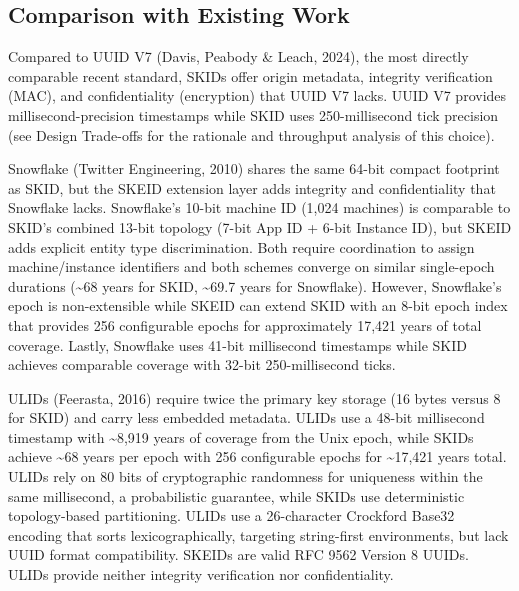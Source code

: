 \documentclass[fleqn,10pt]{wlpeerj}
\begin{document}
\subsection{Comparison with Existing
Work}\label{comparison-with-existing-work}

Compared to UUID V7 (Davis, Peabody \& Leach, 2024), the most directly
comparable recent standard, SKIDs offer origin metadata, integrity
verification (MAC), and confidentiality (encryption) that UUID V7 lacks.
UUID V7 provides millisecond-precision timestamps while SKID uses
250-millisecond tick precision (see Design Trade-offs for the rationale
and throughput analysis of this choice).

Snowflake (Twitter Engineering, 2010) shares the same 64-bit compact
footprint as SKID, but the SKEID extension layer adds integrity and
confidentiality that Snowflake lacks. Snowflake's 10-bit machine ID
(1,024 machines) is comparable to SKID's combined 13-bit topology (7-bit
App ID + 6-bit Instance ID), but SKEID adds explicit entity type
discrimination. Both require coordination to assign machine/instance
identifiers and both schemes converge on similar single-epoch durations
(\textasciitilde68 years for SKID, \textasciitilde69.7 years for
Snowflake). However, Snowflake's epoch is non-extensible while SKEID can
extend SKID with an 8-bit epoch index that provides 256 configurable
epochs for approximately 17,421 years of total coverage. Lastly,
Snowflake uses 41-bit millisecond timestamps while SKID achieves
comparable coverage with 32-bit 250-millisecond ticks.

ULIDs (Feerasta, 2016) require twice the primary key storage (16 bytes
versus 8 for SKID) and carry less embedded metadata. ULIDs use a 48-bit
millisecond timestamp with \textasciitilde8,919 years of coverage from
the Unix epoch, while SKIDs achieve \textasciitilde68 years per epoch
with 256 configurable epochs for \textasciitilde17,421 years total.
ULIDs rely on 80 bits of cryptographic randomness for uniqueness within
the same millisecond, a probabilistic guarantee, while SKIDs use
deterministic topology-based partitioning. ULIDs use a 26-character
Crockford Base32 encoding that sorts lexicographically, targeting
string-first environments, but lack UUID format compatibility. SKEIDs
are valid RFC 9562 Version 8 UUIDs. ULIDs provide neither integrity
verification nor confidentiality.
\end{document}
